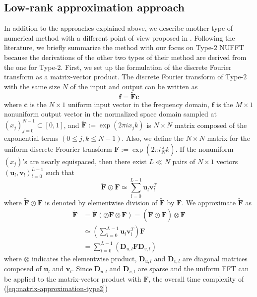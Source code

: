 \subsection{Low-rank approximation approach}
In addition to the approaches explained above, we describe another type of numerical method with a different point of view proposed in \cite{SISC-2018-Townsend}.
Following the literature, we briefly summarize the method with our focus on Type-$2$ NUFFT because the derivations of the other two types of their method are derived from the one for Type-$2$.
First, we set up the formulation of the discrete Fourier transform as a matrix-vector product.
The discrete Fourier transform of Type-$2$ with the same size $N$ of the input and output can be written as 
\begin{equation}
  \bm{f} = \tilde{\bm{F}}\bm{c}
  \label{eq:matrix-vector-product-nufft-type-2}
\end{equation}
where
$\bm{c}$ is the $N \times 1$ uniform input vector in the frequency domain, 
$\bm{f}$ is the $M \times 1$ nonuniform output vector in the normalized space domain sampled at $(x_j)_{j=0}^{N-1} \subset [0, 1]$, and 
$\tilde{\bm{F}} := \exp(2\pi i x_{j}k)$ is $N \times N$ matrix composed of the exponential terms
$(0 \le j, k \le N-1)$.
Also, we define the $N \times N$ matrix for the uniform discrete Frourier transform
$\bm{F} := \exp(2\pi i \frac{j}{N}k)$.
If the nonuniform $(x_j)$'s are nearly equispaced, then there exist $L \ll N$ pairs of $N \times 1$
vectors $(\bm{u}_l, \bm{v}_l)_{l=0}^{L-1}$ such that 
\begin{equation}
  \bm{\tilde{F}}\oslash\bm{F} \simeq
  \sum_{l=0}^{L-1}\bm{u}_{l}\bm{v}_{l}^{T}
\end{equation}
where $\tilde{\bm{F}}\oslash\bm{F}$ is denoted by elementwise division of $\tilde{\bm{F}}$ by $\bm{F}$.
We approximate $\bm{\tilde{F}}$ as 
\begin{align}
     \tilde{\bm{F}}
  &= \tilde{\bm{F}}\left(\oslash\bm{F}\otimes\bm{F}\right)
   = \left(\tilde{\bm{F}}\oslash\bm{F}\right)\otimes\bm{F} \\
  &\simeq \left(\sum_{l=0}^{L-1}\bm{u}_{l}\bm{v}_{l}^{T}\right)\bm{F} \\
  &= \sum_{l=0}^{L-1}\left(\bm{D}_{u,l}\bm{F}\bm{D}_{v,l}\right)
  \label{eq:matrix-approximation-type2}
\end{align}
where $\otimes$ indicates the elementwise product, 
$\bm{D}_{u,l}$ and $\bm{D}_{v,l}$ are diagonal matrices composed of $\bm{u}_{l}$ and $\bm{v}_{l}$.
Since $\bm{D}_{u,l}$ and $\bm{D}_{v,l}$ are sparse and the uniform FFT can be applied to the matrix-vector product with $\bm{F}$, the overall time complexity of (\ref{eq:matrix-approximation-type2})
